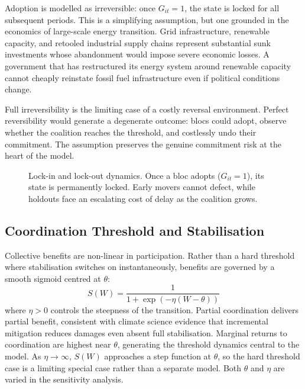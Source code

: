 \documentclass[10pt,a4paper]{article}
\begin{document}
Adoption is modelled as irreversible: once $G_{it} = 1$, the state is locked for all subsequent
periods. This is a simplifying assumption, but one grounded in the economics of large-scale
energy transition. Grid infrastructure, renewable capacity, and retooled industrial supply chains
represent substantial sunk investments whose abandonment would impose severe economic losses.
A government that has restructured its energy system around renewable capacity cannot cheaply
reinstate fossil fuel infrastructure even if political conditions change.

Full irreversibility is the limiting case of a costly reversal environment. Perfect reversibility would generate a degenerate outcome: blocs could adopt, observe whether the coalition reaches the threshold, and costlessly undo their commitment. The assumption preserves the genuine commitment risk at the heart of the model.

\begin{figure}[htbp]
\centering
{}
\caption{Lock-in and lock-out dynamics. Once a bloc adopts ($G_{it}=1$), its state is
permanently locked. Early movers cannot defect, while holdouts face an escalating cost of
delay as the coalition grows.}
\label{fig:lockin}
\end{figure}

\needspace{12em}
\subsection*{Coordination Threshold and Stabilisation}

Collective benefits are non-linear in participation. Rather than a hard threshold where
stabilisation switches on instantaneously, benefits are governed by a smooth sigmoid centred
at $\theta$:
\[
S(W) = \frac{1}{1 + \exp(-\eta(W - \theta))}
\]
where $\eta > 0$ controls the steepness of the transition. Partial coordination delivers partial
benefit, consistent with climate science evidence that incremental mitigation reduces damages
even absent full stabilisation. Marginal returns to coordination are highest near $\theta$,
generating the threshold dynamics central to the model. As $\eta \to \infty$, $S(W)$ approaches
a step function at $\theta$, so the hard threshold case is a limiting special case rather than a
separate model. Both $\theta$ and $\eta$ are varied in the sensitivity analysis.
\end{document}
